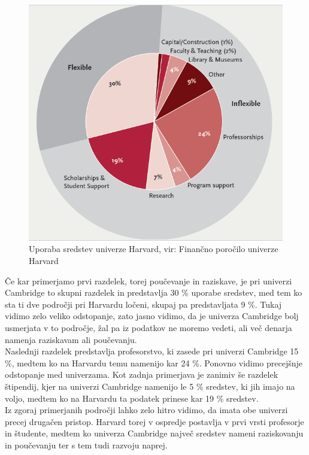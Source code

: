 \documentclass[12pt, a4paper]{article}
\begin{document}
\begin{figure}[!h]
\centering
\includegraphics[width = 12 cm]{slike/harvard.png}
\caption{Uporaba sredstev univerze Harvard, vir: Finančno poročilo univerze Harvard}
\label{Slika 4}
\end{figure}


Če kar primerjamo prvi razdelek, torej poučevanje in raziskave, je pri univerzi Cambridge to skupni razdelek in predstavlja 30 \% uporabe sredstev, med tem ko sta ti dve področji pri Harvardu ločeni, skupaj pa predstavljata 9 \%. Tukaj vidimo zelo veliko odstopanje, zato jasno vidimo, da je univerza Cambridge bolj usmerjata v to področje, žal pa iz podatkov ne moremo vedeti, ali več denarja namenja raziskavam ali poučevanju. \\

Naslednji razdelek predstavlja profesorstvo, ki zasede pri univerzi Cambridge 15 \%, medtem ko na Harvardu temu namenijo kar 24 \%. Ponovno vidimo precejšnje odstopanje med univerzama. Kot zadnja primerjava je zanimiv še razdelek štipendij, kjer na univerzi Cambridge namenijo le 5 \% sredstev, ki jih imajo na voljo, medtem ko na Harvardu ta podatek prinese kar 19 \% sredstev. \\

Iz zgoraj primerjanih področji lahko zelo hitro vidimo, da imata obe univerzi precej drugačen pristop. Harvard torej v ospredje postavlja v prvi vrsti profesorje in študente, medtem ko univerza Cambridge največ sredstev nameni raziskovanju in poučevanju ter s tem tudi razvoju naprej. 
\end{document}
